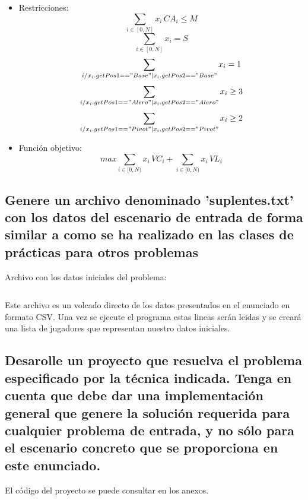 \documentclass[a4paper,12pt]{article}
\begin{document}
\begin{itemize}
\item Restricciones:\\
\setcounter{equation}{0}
\begin{equation}
 \sum_{i \in [0,N]}{x_i \, CA_i} \leq M
\end{equation}
 \begin{equation}
 \sum_{i \in [0,N]}{x_i} = S
\end{equation}
\begin{equation}
 \sum_{i / x_i.getPos1=="Base" | x_i.getPos2=="Base"}{x_i} = 1
\end{equation}
\begin{equation}
 \sum_{i / x_i.getPos1=="Alero" | x_i.getPos2=="Alero"}{x_i} \geq 3
\end{equation}
\begin{equation}
 \sum_{i / x_i.getPos1=="Pivot" | x_i.getPos2=="Pivot"}{x_i} \geq 2
\end{equation}
\item{Función objetivo:}
\begin{equation*}
max  \sum_{i \in [0,N)}{x_i \, VC_i}+\sum_{i \in [0,N)}{x_i \, VL_i}
\end{equation*}
\end{itemize}


\subsection{Genere un archivo denominado 'suplentes.txt' con los datos del escenario de entrada
de forma similar a como se ha realizado en las clases de prácticas para otros problemas}
Archivo con los datos iniciales del problema:

\inputminted[fontsize=\footnotesize,breaklines]{text}{ficheros/suplentes.txt}

Este archivo es un volcado directo de los datos presentados en el enunciado en formato CSV.
Una vez se ejecute el programa estas lineas serán leidas y se creará una lista de jugadores que representan nuestro datos iniciales.
\subsection{Desarolle un proyecto que resuelva el problema especificado por la técnica indicada.
Tenga en cuenta que debe dar una implementación general que genere la solución requerida para
cualquier problema de entrada, y no sólo para el escenario concreto que se proporciona en este enunciado.}
El código del proyecto se puede consultar en los anexos.
\end{document}
